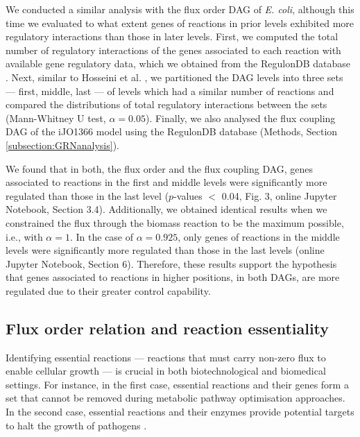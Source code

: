 \documentclass[12pt]{article}
\begin{document}
We conducted a similar analysis with the flux order DAG of \emph{E. coli}, although this time we evaluated to what extent genes of reactions in prior levels exhibited more regulatory interactions than those in later levels. First, we computed the total number of regulatory interactions of the genes associated to each reaction with available gene regulatory data, which we obtained from the RegulonDB database \cite{Gama-Castro2016}. Next, similar to Hosseini et al. \cite{Hosseini2015}, we partitioned the DAG levels into three sets --- first, middle, last --- of levels which had a similar number of reactions and compared the distributions of total regulatory interactions between the sets (Mann-Whitney U test, $\alpha = 0.05$). Finally, we also analysed the flux coupling DAG of the iJO1366 model using the RegulonDB database (Methods, Section \ref{subsection:GRNanalysis}).

We found that in both, the flux order and the flux coupling DAG, genes associated to reactions in the first and middle levels were significantly more regulated than those in the last level ($p$-values $<$ 0.04, Fig. 3, online Jupyter Notebook, Section 3.4). {\color{blue} Additionally, we obtained identical results when we constrained the flux through the biomass reaction to be the maximum possible, i.e., with $\alpha=1$. In the case of $\alpha=0.925$, only genes of reactions in the middle levels were significantly more regulated than those in the last levels (online Jupyter Notebook, Section 6).} Therefore, these results support the hypothesis that genes associated to reactions in higher positions, in both DAGs, are more regulated due to their greater control capability.

\subsection{Flux order relation and reaction essentiality}
Identifying essential reactions --- reactions that must carry non-zero flux to enable cellular growth --- is crucial in both biotechnological and biomedical settings. For instance, in the first case, essential reactions and their genes form a set that cannot be removed during metabolic pathway optimisation approaches. In the second case, essential reactions and their enzymes provide potential targets to halt the growth of pathogens \cite{Gatto2015,Salleh2013,Xavier2018}.
\end{document}
